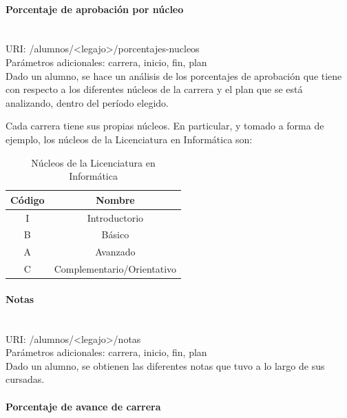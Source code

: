 \paragraph{Porcentaje de aprobación por núcleo}\mbox{}\\

URI: /alumnos/<legajo>/porcentajes-nucleos \\

Parámetros adicionales: carrera, inicio, fin, plan \\

Dado un alumno, se hace un análisis de los porcentajes de aprobación que tiene con respecto a los diferentes núcleos de la carrera y el plan que se está analizando, dentro del período elegido.

Cada carrera tiene sus propias núcleos. En particular, y tomado a forma de ejemplo, los núcleos de la Licenciatura en Informática son:

\begin{table}[!htbp]
    \centering
    \makegapedcells
    \begin{tabular}{|c|c|}
    \hline
    Código & Nombre \\ \hline
    I & Introductorio \\ \hline
    B & Básico\\ \hline
    A & Avanzado \\ \hline
    C & Complementario/Orientativo \\ \hline
    \end{tabular}
    \caption{Núcleos de la Licenciatura en Informática}
    \label{tab:tabla_nucleos}
\end{table}


\paragraph{Notas}\mbox{}\\

URI: /alumnos/<legajo>/notas \\

Parámetros adicionales: carrera, inicio, fin, plan \\

Dado un alumno, se obtienen las diferentes notas que tuvo a lo largo de sus cursadas.

\paragraph{Porcentaje de avance de carrera}\mbox{}\\


